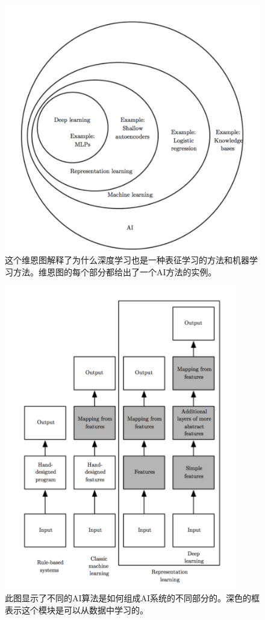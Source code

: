 \documentclass[a4paper,11pt]{book}
\begin{document}
\begin{figure}[htbp] %
   \centering
   \includegraphics[width=6in]{fig/chap1/ai_approach.png} 
   \caption{这个维恩图解释了为什么深度学习也是一种表征学习的方法和机器学习方法。维恩图的每个部分都给出了一个AI方法的实例。}
   \label{fig:ai_approach}
\end{figure}

\begin{figure}[htbp] %
   \centering
   \includegraphics[width=4in]{fig/chap1/ai_discipline.png} 
   \caption{此图显示了不同的AI算法是如何组成AI系统的不同部分的。深色的框表示这个模块是可以从数据中学习的。}
   \label{fig:ai_discipline}
\end{figure}
\end{document}
